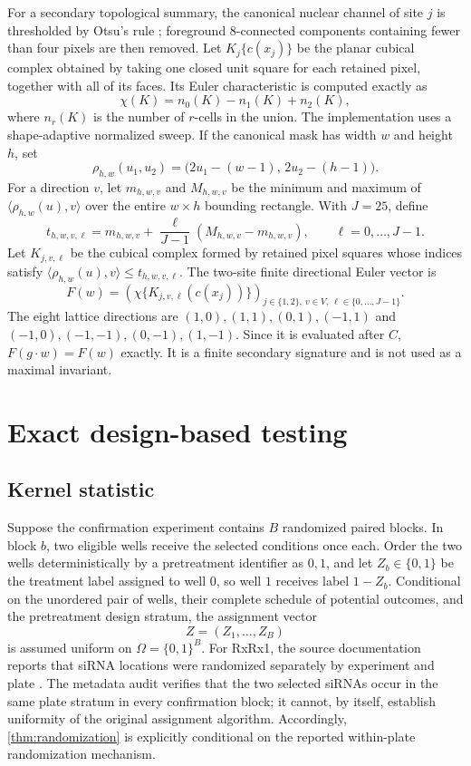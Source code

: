 \documentclass[11pt]{article}
\theoremstyle{definition}
\theoremstyle{remark}
\newcommand{\1}{\mathbf 1}
\begin{document}
For a secondary topological summary, the canonical nuclear channel of site
\(j\) is thresholded by Otsu's rule \citep{otsu1979threshold}; foreground
8-connected components containing fewer than four pixels are then removed.
Let \(K_j\{c(x_j)\}\) be the planar cubical complex obtained by taking one
closed unit square for each retained pixel, together with all of its faces.
Its Euler characteristic is computed exactly as
\[
 \chi(K)=n_0(K)-n_1(K)+n_2(K),
\]
where \(n_r(K)\) is the number of \(r\)-cells in the union.  The implementation
uses a shape-adaptive normalized sweep.  If the canonical mask has width \(w\)
and height \(h\), set
\[
 \rho_{h,w}(u_1,u_2)
 =
 \bigl(2u_1-(w-1),\,2u_2-(h-1)\bigr).
\]
For a direction \(v\), let \(m_{h,w,v}\) and \(M_{h,w,v}\) be the minimum and
maximum of \(\langle\rho_{h,w}(u),v\rangle\) over the entire \(w\times h\)
bounding rectangle.  With \(J=25\), define
\[
 t_{h,w,v,\ell}
 =
 m_{h,w,v}+\frac{\ell}{J-1}(M_{h,w,v}-m_{h,w,v}),
 \qquad \ell=0,\ldots,J-1.
\]
Let \(K_{j,v,\ell}\) be the cubical complex formed by retained pixel squares
whose indices satisfy
\(\langle\rho_{h,w}(u),v\rangle\le t_{h,w,v,\ell}\).  The two-site finite
directional Euler vector is
\begin{equation}\label{eq:finite-euler}
 F(w)=
 \left(
 \chi\{K_{j,v,\ell}(c(x_j))\}
 \right)_{j\in\{1,2\},\ v\in V,\ \ell\in\{0,\ldots,J-1\}}.
\end{equation}
The eight lattice directions are
\((1,0),(1,1),(0,1),(-1,1)\) and
\((-1,0),(-1,-1),(0,-1),(1,-1)\).
Since it is evaluated after \(C\),
\(F(g\cdot w)=F(w)\) exactly.  It is a finite secondary signature and is not
used as a maximal invariant.

\section{Exact design-based testing}

\subsection{Kernel statistic}

Suppose the confirmation experiment contains \(B\) randomized paired blocks.
In block \(b\), two eligible wells receive the selected conditions once each.
Order the two wells deterministically by a pretreatment identifier as \(0,1\),
and let
\(Z_b\in\{0,1\}\) be the treatment label assigned to well \(0\), so well \(1\)
receives label \(1-Z_b\).  Conditional on the unordered pair of wells, their
complete schedule of potential outcomes, and the pretreatment design stratum,
the assignment vector
\[
  Z=(Z_1,\ldots,Z_B)
\]
is assumed uniform on \(\Omega=\{0,1\}^B\).  For RxRx1, the source documentation
reports that siRNA locations were randomized separately by experiment and
plate \citep{sypetkowski2023rxrx1}.  The metadata audit verifies that the two
selected siRNAs occur in the same plate stratum in every confirmation block; it
cannot, by itself, establish uniformity of the original assignment algorithm.
Accordingly, \cref{thm:randomization} is explicitly conditional on the reported
within-plate randomization mechanism.
\end{document}
